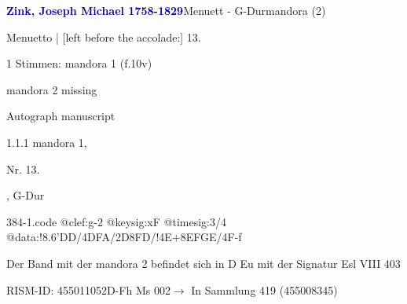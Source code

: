 \documentclass[twocolumn]{book}
\begin{document}
\par \vspace{7pt} \textcolor{darkblue}{\textbf{Zink, Joseph Michael  1758-1829}}\hfillplus{\textbf{[384]}}\newline Menuett - G-Dur\newline mandora (2)
\par \begin{itshape}[f.10v, at left:] Menuetto | [left before the accolade:] 13.\end{itshape} 
\par \textcolor{darkblue}{}  1 Stimmen: mandora 1  (f.10v)\newline \begin{small} mandora 2 missing\end{small} \newline Autograph manuscript
\par 1.1.1  mandora 1, \begin{itshape}Nr. 13.\end{itshape}, G-Dur  
\begin{filecontents*}{384-1.code}
@clef:g-2
@keysig:xF
@timesig:3/4
@data:!{8.6'DD}/4DFA/2D{8FD}/!4E+{8EFGE}/4F-f
\end{filecontents*}
\newline
%
\par Der Band mit der mandora 2 befindet sich in D Eu mit der Signatur Esl VIII 403
\par RISM-ID: 455011052\newline D-Fh  Ms 002\newline $\rightarrow$ In Sammlung 419 (455008345)
      
\end{document}
